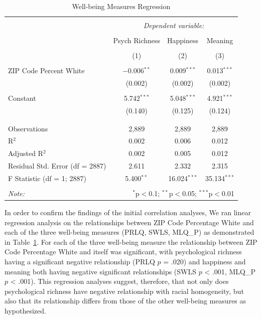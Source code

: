 \documentclass[
  man,floatsintext]{apa7}
\begin{document}
\begin{table}[!htbp] \centering 
  \caption{Well-being Measures Regression} 
  \label{tab:compare-wellbeing-regression} 
\begin{tabular}{@{\extracolsep{1pt}}lccc} 
\\[-1.8ex]\hline 
\hline \\[-1.8ex] 
 & \multicolumn{3}{c}{\textit{Dependent variable:}} \\ 
\cline{2-4} 
\\[-1.8ex] & Psych Richness & Happiness & Meaning \\ 
\\[-1.8ex] & (1) & (2) & (3)\\ 
\hline \\[-1.8ex] 
 ZIP Code Percent White & $-$0.006$^{**}$ & 0.009$^{***}$ & 0.013$^{***}$ \\ 
  & (0.002) & (0.002) & (0.002) \\ 
  & & & \\ 
 Constant & 5.742$^{***}$ & 5.048$^{***}$ & 4.921$^{***}$ \\ 
  & (0.140) & (0.125) & (0.124) \\ 
  & & & \\ 
\hline \\[-1.8ex] 
Observations & 2,889 & 2,889 & 2,889 \\ 
R$^{2}$ & 0.002 & 0.006 & 0.012 \\ 
Adjusted R$^{2}$ & 0.002 & 0.005 & 0.012 \\ 
Residual Std. Error (df = 2887) & 2.611 & 2.332 & 2.315 \\ 
F Statistic (df = 1; 2887) & 5.400$^{**}$ & 16.024$^{***}$ & 35.134$^{***}$ \\ 
\hline 
\hline \\[-1.8ex] 
\textit{Note:}  & \multicolumn{3}{r}{$^{*}$p$<$0.1; $^{**}$p$<$0.05; $^{***}$p$<$0.01} \\ 
\end{tabular} 
\end{table}

In order to confirm the findings of the initial correlation analyses, We ran linear regression analysis on the relationships between ZIP Code Percentage White and each of the three well-being measures (PRLQ, SWLS, MLQ\_P) as demonstrated in Table~\ref{tab:compare-wellbeing-regression}. For each of the three well-being measure the relationship between ZIP Code Percentage White and itself was significant, with psychological richness having a significant negative relationship (PRLQ \(p\) = .020) and happiness and meaning both having negative significant relationships (SWLS \(p\) \textless{} .001, MLQ\_P \(p\) \textless{} .001). This regression analyses suggest, therefore, that not only does psychological richness have negative relationship with racial homogeneity, but also that its relationship differs from those of the other well-being measures as hypothesized.
\end{document}
